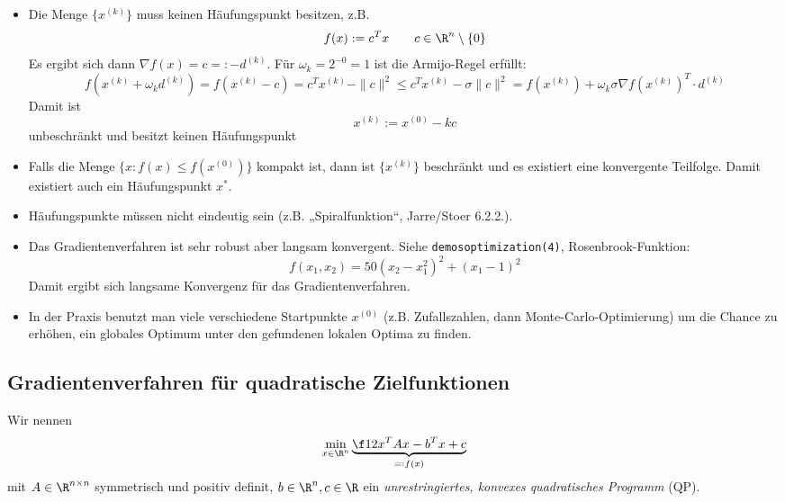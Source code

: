 \documentclass[11pt]{scrbook}
\begin{document}
\begin{st}[Konvergenz]
\begin{note}
\begin{itemize}
			\item
				Die Menge $\{x^{(k)}\}$ muss keinen Häufungspunkt besitzen, z.B.
				\[
					f(x) := c^T x \qquad c \in \R^n \setminus\{0\}
				\]
				Es ergibt sich dann $\nabla f(x) = c =: -d^{(k)}$.
				Für $\omega_k = 2^{-0} = 1$ ist die Armijo-Regel erfüllt:
				\[
					f(x^{(k)} +\omega_k d^{(k)}) = f(x^{(k)} - c) = c^T x^{(k)} - \|c\|^2 \le c^T x^{(k)} - \sigma \|c\|^2 = f(x^{(k)}) + \omega_k \sigma \nabla f(x^{(k)})^T \cdot d^{(k)}
				\]
				Damit ist
				\[
					x^{(k)} := x^{(0)} - k c
				\]
				unbeschränkt und besitzt keinen Häufungspunkt
			\item
				Falls die Menge $\{x : f(x) \le f(x^{(0)}) \}$ kompakt ist, dann ist $\{x^{(k)}\}$ beschränkt und es existiert eine konvergente Teilfolge.
				Damit existiert auch ein Häufungspunkt $x^*$.
			\item
				Häufungspunkte müssen nicht eindeutig sein (z.B. „Spiralfunktion“, Jarre/Stoer 6.2.2.).
			\item
				Das Gradientenverfahren ist sehr robust aber langsam konvergent.
				Siehe \texttt{demos\textunderscore optimization(4)}, Rosenbrook-Funktion:
				\[
					f(x_1, x_2) = 50 (x_2-x_1^2)^2 + (x_1-1)^2
				\]
				Damit ergibt sich langsame Konvergenz für das Gradientenverfahren.
			\item
				In der Praxis benutzt man viele verschiedene Startpunkte $x^{(0)}$ (z.B. Zufallszahlen, dann Monte-Carlo-Optimierung) um die Chance zu erhöhen, ein globales Optimum unter den gefundenen lokalen Optima zu finden.
		 \end{itemize}
	 \end{note}
\end{st}


\subsection{Gradientenverfahren für quadratische Zielfunktionen}


\begin{df}[Unrestringiertes QP] \label{4.9}
	Wir nennen
	\[
		\min_{x\in \R^n} \underbrace{\f 12 x^T A x - b^T x + c}_{=:f(x)}
	\]
	mit $A \in \R^{n\times n}$ symmetrisch und positiv definit, $b\in \R^n, c\in \R$ ein
	\emph{unrestringiertes, konvexes quadratisches Programm} (QP).
\end{df}
\end{document}

